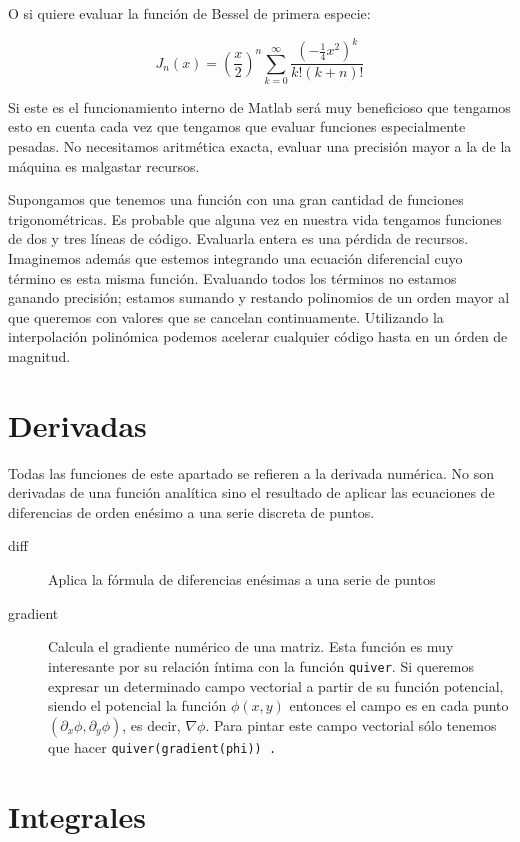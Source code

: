 O si quiere evaluar la función de Bessel de primera especie:

$$J_{n}(x)=\left(\frac{x}{2}\right)^{n}\sum_{k=0}^{\infty}
\frac{(-\frac{1}{4}x^{2})^{k}}{k!(k+n)!}$$

Si este es el funcionamiento interno de Matlab será muy beneficioso
que tengamos esto en cuenta cada vez que tengamos que evaluar
funciones especialmente pesadas. No necesitamos aritmética exacta,
evaluar una precisión mayor a la de la máquina es malgastar recursos.

Supongamos que tenemos una función con una gran cantidad de funciones
trigonométricas. Es probable que alguna vez en nuestra vida tengamos
funciones de dos y tres líneas de código. Evaluarla entera es una
pérdida de recursos. Imaginemos además que estemos integrando una
ecuación diferencial cuyo término es esta misma función. Evaluando
todos los términos no estamos ganando precisión; estamos sumando y
restando polinomios de un orden mayor al que queremos con valores que
se cancelan continuamente. Utilizando la interpolación polinómica
podemos acelerar cualquier código hasta en un órden de magnitud.


\section{Derivadas}

Todas las funciones de este apartado se refieren a la derivada
numérica.  No son derivadas de una función analítica sino el resultado
de aplicar las ecuaciones de diferencias de orden enésimo a una serie
discreta de puntos.

\begin{description}
\item [diff\texttt{}]Aplica la fórmula de diferencias
  enésimas a una serie de puntos
\item [gradient\texttt{}]Calcula el gradiente numérico
  de una matriz. Esta función es muy interesante por su relación
  íntima con la función \texttt{quiver}. Si queremos expresar un
  determinado campo vectorial a partir de su función potencial, siendo
  el potencial la función $\phi(x,y)$ entonces el campo es en cada
  punto $\left(\partial_{x}\phi,\partial_{y}\phi\right)$, es decir,
  $\nabla\phi$. Para pintar este campo vectorial sólo tenemos que
  hacer \texttt{quiver(gradient(phi)) .}
\end{description}

\section{Integrales}

